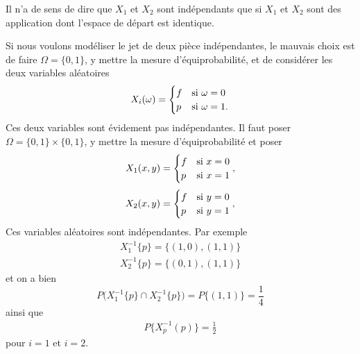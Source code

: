 \begin{remark}
     Il n'a de sens de dire que \( X_1\) et \( X_2\) sont indépendants que si \( X_1\) et \( X_2\) sont des application dont l'espace de départ est identique.

     Si nous voulons modéliser le jet de deux pièce indépendantes, le mauvais choix est de faire \( \Omega=\{ 0,1 \}\), y mettre la mesure d'équiprobabilité, et de considérer les deux variables aléatoires
     \begin{equation}
         X_i(\omega)=\begin{cases}
             f   &   \text{si \( \omega=0\)}\\
             p   &    \text{si \( \omega=1\)}.
         \end{cases}
     \end{equation}
     Ces deux variables sont évidement pas indépendantes. Il faut poser \( \Omega=\{ 0,1 \}\times \{ 0,1 \}\), y mettre la mesure d'équiprobabilité et poser
     \begin{equation}
         X_1(x,y)=\begin{cases}
             f   &   \text{si \( x=0\)}\\
             p   &    \text{si \( x=1\)}
         \end{cases},
     \end{equation}
     \begin{equation}
         X_2(x,y)=\begin{cases}
             f   &   \text{si \( y=0\)}\\
             p   &    \text{si \( y=1\)}
         \end{cases},
     \end{equation}
     Ces variables aléatoires sont indépendantes. Par exemple
     \begin{subequations}
         \begin{align}
             X_1^{-1}\{ p \}=\{ (1,0),(1,1) \}\\
             X_2^{-1}\{ p \}=\{ (0,1),(1,1) \}
         \end{align}
     \end{subequations}
     et on a bien
     \begin{equation}
         P\big( X_1^{-1}\{ p \}\cap X_2^{-1}\{ p \} \big)=P\{ (1,1) \}=\frac{1}{ 4 }
     \end{equation}
     ainsi que
     \begin{subequations}
         \begin{align}
             P\{ X_p^{-1}(p) \}=\frac{ 1 }{2}
         \end{align}
     \end{subequations}
     pour \( i=1\) et \( i=2\).
\end{remark}

